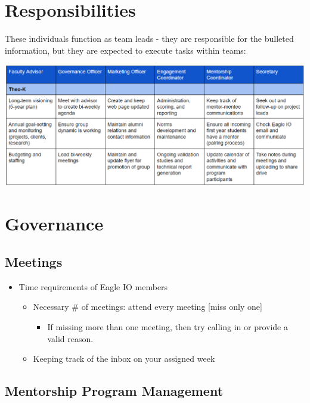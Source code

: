 \documentclass[
]{book}
\providecommand{\tightlist}{%
  \setlength{\itemsep}{0pt}\setlength{\parskip}{0pt}}
\begin{document}
\hypertarget{responsibilities}{%
\chapter{Responsibilities}\label{responsibilities}}

These individuals function as team leads - they are responsible for the bulleted information, but they are expected to execute tasks within teams:

\includegraphics{images/roles.PNG}

\hypertarget{governance}{%
\chapter{Governance}\label{governance}}

\hypertarget{meetings}{%
\section{Meetings}\label{meetings}}

\begin{itemize}
\tightlist
\item
  Time requirements of Eagle IO members

  \begin{itemize}
  \tightlist
  \item
    Necessary \# of meetings: attend every meeting {[}miss only one{]}

    \begin{itemize}
    \tightlist
    \item
      If missing more than one meeting, then try calling in or provide a valid reason.
    \end{itemize}
  \item
    Keeping track of the inbox on your assigned week
  \end{itemize}
\end{itemize}

\hypertarget{mentorship-program-management}{%
\section{Mentorship Program Management}\label{mentorship-program-management}}
\end{document}
